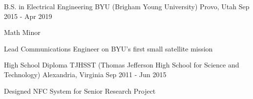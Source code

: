 

\begin{cventries}

  \cventry
  {B.S. in Electrical Engineering} %
  {BYU (Brigham Young University)} %
  {Provo, Utah} %
  {Sep 2015 - Apr 2019} %
    {
      \begin{cvitems} %
      \item {Math Minor}
      \item {Lead Communications Engineer on BYU's first small satellite mission}
      \end{cvitems}
    }

  \cventry
  {High School Diploma} %
  {TJHSST (Thomas Jefferson High School for Science and Technology)} %
  {Alexandria, Virginia} %
  {Sep 2011 - Jun 2015} %
    {
      \begin{cvitems} %
      \item {Designed NFC System for Senior Research Project}
      \end{cvitems}
    }

\end{cventries}
